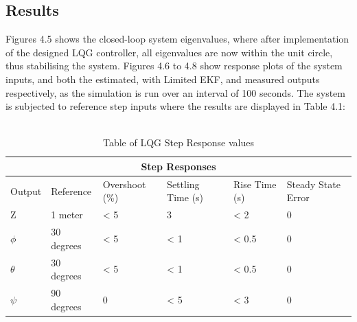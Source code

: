 \documentclass[12pt,a4paper,twoside]{report}
\begin{document}
			\subsection{Results}
				
				Figures 4.5 shows the closed-loop system eigenvalues, where after implementation of the designed LQG controller, all eigenvalues are now within the unit circle, thus stabilising the system. Figures 4.6 to 4.8 show response plots of the system inputs, and both the estimated, with Limited EKF, and measured outputs respectively, as the simulation is run over an interval of 100 seconds. The system is subjected to reference step inputs where the results are displayed in Table 4.1:
				\\ \\
				
				\begin{table}[h!]
					\centering
					\begin{tabular}{ |p{1.5cm}|p{3cm}|p{2cm}|p{2cm}|p{2cm}|p{2cm}|  }
						\hline
						\multicolumn{6}{|c|}{Step Responses} \\
						\hline
						Output   &  Reference  & Overshoot (\%) & Settling Time (s) & Rise Time (s) & Steady State Error \\
						\hline
						Z        &  1 meter         & < 5 &  3   & < 2   & 0\\
						$\phi$   &  30 degrees      & < 5 & < 1  & < 0.5 & 0\\
						$\theta$ &  30 degrees      & < 5 & < 1  & < 0.5 & 0\\
						$\psi$   & 	90 degrees      & 0   & < 5  & < 3   & 0\\
						\hline
					\end{tabular}
					\caption{Table of LQG Step Response values}
					\label{table:lqgstepresponses}
				\end{table}
			
\end{document}
